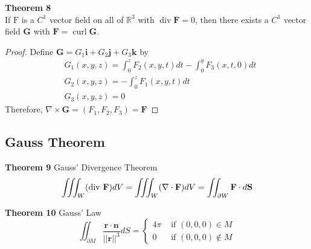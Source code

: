 \documentclass[11pt]{article}
\begin{document}
\textbf{Theorem 8} \\
If $\mathrm{F}$ is a $C^{1}$ vector field on all of $\mathbb{R}^{3}$ with $\operatorname{div} \mathbf{F}=0$, then there exists a $C^{1}$ vector field $\mathbf{G}$ with $\mathbf{F}=\operatorname{curl} \mathbf{G}$.
\begin{proof}
    Define $\mathbf{G}=G_{1} \mathbf{i}+G_{2} \mathbf{j}+G_{3} \mathbf{k}$ by
    $$
    \begin{aligned}
    &G_{1}(x, y, z)=\int_{0}^{z} F_{2}(x, y, t) d t-\int_{0}^{y} F_{3}(x, t, 0) d t \\
    &G_{2}(x, y, z)=-\int_{0}^{z} F_{1}(x, y, t) d t\\
    &G_3(x,y,z) = 0
    \end{aligned}
    $$
    Therefore, $\nabla \times \mathbf{G} = (F_1,F_2,F_3) = \mathbf{F}$
\end{proof}


\subsection{Gauss Theorem}
\textbf{Theorem 9} Gauss’ Divergence Theorem
\[\iiint_{W}({\rm div} ~\mathbf{F}) d V=\iiint_{W}(\nabla \cdot \mathbf{F}) d V=\iint_{\partial W} \mathbf{F} \cdot d \mathbf{S}\]

\textbf{Theorem 10} Gauss’ Law
\[\iint_{\partial M} \frac{\mathbf{r} \cdot \mathbf{n}}{||\mathbf{r}||^{3}} d S= \begin{cases}4 \pi & \text { if }(0,0,0) \in M \\ 0 & \text { if }(0,0,0) \notin M\end{cases}\]
\end{document}
